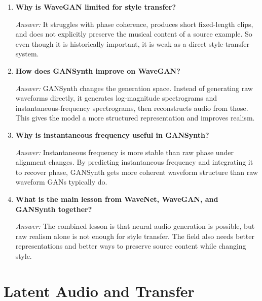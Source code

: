 \documentclass[11pt]{article}
\newcommand{\qa}[2]{
\item \textbf{#1}

\textit{Answer:} #2
}
\begin{document}
\begin{enumerate}[start=17]
\qa{Why is WaveGAN limited for style transfer?}{
It struggles with phase coherence, produces short fixed-length clips, and does not explicitly preserve the musical content of a source example. So even though it is historically important, it is weak as a direct style-transfer system.
}

\qa{How does GANSynth improve on WaveGAN?}{
GANSynth changes the generation space. Instead of generating raw waveforms directly, it generates log-magnitude spectrograms and instantaneous-frequency spectrograms, then reconstructs audio from those. This gives the model a more structured representation and improves realism.
}

\qa{Why is instantaneous frequency useful in GANSynth?}{
Instantaneous frequency is more stable than raw phase under alignment changes. By predicting instantaneous frequency and integrating it to recover phase, GANSynth gets more coherent waveform structure than raw waveform GANs typically do.
}

\qa{What is the main lesson from WaveNet, WaveGAN, and GANSynth together?}{
The combined lesson is that neural audio generation is possible, but raw realism alone is not enough for style transfer. The field also needs better representations and better ways to preserve source content while changing style.
}
\end{enumerate}

\section{Latent Audio and Transfer}
\end{document}
